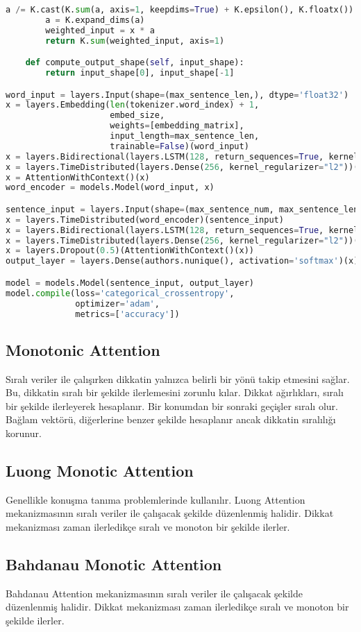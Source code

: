 \begin{lstlisting}[language=Python]
        a /= K.cast(K.sum(a, axis=1, keepdims=True) + K.epsilon(), K.floatx())
        a = K.expand_dims(a)
        weighted_input = x * a
        return K.sum(weighted_input, axis=1)

    def compute_output_shape(self, input_shape):
        return input_shape[0], input_shape[-1]

word_input = layers.Input(shape=(max_sentence_len,), dtype='float32')
x = layers.Embedding(len(tokenizer.word_index) + 1, 
                     embed_size, 
                     weights=[embedding_matrix], 
                     input_length=max_sentence_len, 
                     trainable=False)(word_input)
x = layers.Bidirectional(layers.LSTM(128, return_sequences=True, kernel_regularizer="l2"))(x)
x = layers.TimeDistributed(layers.Dense(256, kernel_regularizer="l2"))(x)
x = AttentionWithContext()(x)
word_encoder = models.Model(word_input, x)

sentence_input = layers.Input(shape=(max_sentence_num, max_sentence_len), dtype='float32')
x = layers.TimeDistributed(word_encoder)(sentence_input)
x = layers.Bidirectional(layers.LSTM(128, return_sequences=True, kernel_regularizer="l2"))(x)
x = layers.TimeDistributed(layers.Dense(256, kernel_regularizer="l2"))(x)
x = layers.Dropout(0.5)(AttentionWithContext()(x))
output_layer = layers.Dense(authors.nunique(), activation='softmax')(x)

model = models.Model(sentence_input, output_layer)
model.compile(loss='categorical_crossentropy', 
              optimizer='adam', 
              metrics=['accuracy'])
\end{lstlisting}

\subsection{Monotonic Attention}
Sıralı veriler ile çalışırken dikkatin yalnızca belirli bir yönü takip etmesini sağlar. Bu, dikkatin sıralı bir şekilde ilerlemesini zorunlu kılar. Dikkat ağırlıkları, sıralı bir şekilde ilerleyerek hesaplanır. Bir konumdan bir sonraki geçişler sıralı olur. Bağlam vektörü, diğerlerine benzer şekilde hesaplanır ancak dikkatin sıralılığı korunur.

\subsection{Luong Monotic Attention}
Genellikle konuşma tanıma problemlerinde kullanılır. Luong Attention mekanizmasının sıralı veriler ile çalışacak şekilde düzenlenmiş halidir. Dikkat mekanizması zaman ilerledikçe sıralı ve monoton bir şekilde ilerler.

\subsection{Bahdanau Monotic Attention}
Bahdanau Attention mekanizmasının sıralı veriler ile çalışacak şekilde düzenlenmiş halidir. Dikkat mekanizması zaman ilerledikçe sıralı ve monoton bir şekilde ilerler.

\newpage